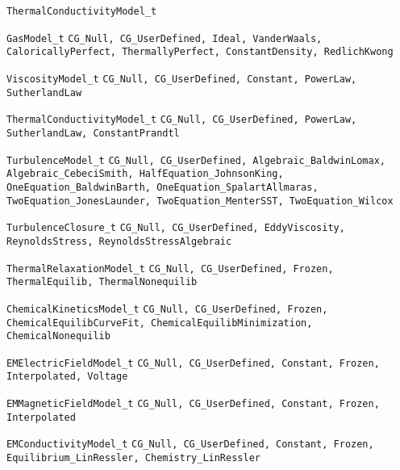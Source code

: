 \begin{Ventryi}{\texttt{ThermalConductivityModel\_t}}\raggedright
\item [\texttt{GasModel\_t}]
      \texttt{CG\_Null, CG\_UserDefined, Ideal, VanderWaals, CaloricallyPerfect,
      ThermallyPerfect, ConstantDensity, RedlichKwong}
\item [\texttt{ViscosityModel\_t}]
      \texttt{CG\_Null, CG\_UserDefined, Constant, PowerLaw, SutherlandLaw}
\item [\texttt{ThermalConductivityModel\_t}]
      \texttt{CG\_Null, CG\_UserDefined, PowerLaw, SutherlandLaw, ConstantPrandtl}
\item [\texttt{TurbulenceModel\_t}]
      \texttt{CG\_Null, CG\_UserDefined, Algebraic\_BaldwinLomax,
      Algebraic\_CebeciSmith, HalfEquation\_JohnsonKing,
      OneEquation\_BaldwinBarth, OneEquation\_SpalartAllmaras,
      TwoEquation\_JonesLaunder, TwoEquation\_MenterSST,
      TwoEquation\_Wilcox}
\item [\texttt{TurbulenceClosure\_t}]
      \texttt{CG\_Null, CG\_UserDefined, EddyViscosity, ReynoldsStress,
      ReynoldsStressAlgebraic}
\item [\texttt{ThermalRelaxationModel\_t}]
      \texttt{CG\_Null, CG\_UserDefined, Frozen, ThermalEquilib,
      ThermalNonequilib}
\item [\texttt{ChemicalKineticsModel\_t}]
      \texttt{CG\_Null, CG\_UserDefined, Frozen,
      ChemicalEquilibCurveFit, ChemicalEquilibMinimization,
      ChemicalNonequilib}
\item [\texttt{EMElectricFieldModel\_t}]
      \texttt{CG\_Null, CG\_UserDefined, Constant, Frozen, Interpolated,
      Voltage}
\item [\texttt{EMMagneticFieldModel\_t}]
      \texttt{CG\_Null, CG\_UserDefined, Constant, Frozen, Interpolated}
\item [\texttt{EMConductivityModel\_t}]
      \texttt{CG\_Null, CG\_UserDefined, Constant, Frozen, Equilibrium\_LinRessler,
      Chemistry\_LinRessler}
\end{Ventryi}

